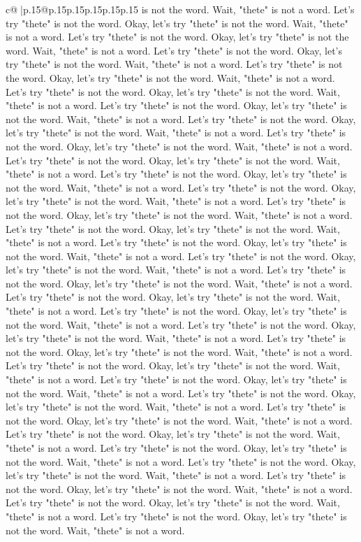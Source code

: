 \documentclass{article}
\begin{document}
{\begin{supertabular}{c@{$\;$}|p{.15\linewidth}@{}p{.15\linewidth}p{.15\linewidth}p{.15\linewidth}p{.15\linewidth}p{.15\linewidth}}
{{{is not the word. Wait, "thete" is not a word. Let's try "thete" is not the word. Okay, let's try "thete" is not the word. Wait, "thete" is not a word. Let's try "thete" is not the word. Okay, let's try "thete" is not the word. Wait, "thete" is not a word. Let's try "thete" is not the word. Okay, let's try "thete" is not the word. Wait, "thete" is not a word. Let's try "thete" is not the word. Okay, let's try "thete" is not the word. Wait, "thete" is not a word. Let's try "thete" is not the word. Okay, let's try "thete" is not the word. Wait, "thete" is not a word. Let's try "thete" is not the word. Okay, let's try "thete" is not the word. Wait, "thete" is not a word. Let's try "thete" is not the word. Okay, let's try "thete" is not the word. Wait, "thete" is not a word. Let's try "thete" is not the word. Okay, let's try "thete" is not the word. Wait, "thete" is not a word. Let's try "thete" is not the word. Okay, let's try "thete" is not the word. Wait, "thete" is not a word. Let's try "thete" is not the word. Okay, let's try "thete" is not the word. Wait, "thete" is not a word. Let's try "thete" is not the word. Okay, let's try "thete" is not the word. Wait, "thete" is not a word. Let's try "thete" is not the word. Okay, let's try "thete" is not the word. Wait, "thete" is not a word. Let's try "thete" is not the word. Okay, let's try "thete" is not the word. Wait, "thete" is not a word. Let's try "thete" is not the word. Okay, let's try "thete" is not the word. Wait, "thete" is not a word. Let's try "thete" is not the word. Okay, let's try "thete" is not the word. Wait, "thete" is not a word. Let's try "thete" is not the word. Okay, let's try "thete" is not the word. Wait, "thete" is not a word. Let's try "thete" is not the word. Okay, let's try "thete" is not the word. Wait, "thete" is not a word. Let's try "thete" is not the word. Okay, let's try "thete" is not the word. Wait, "thete" is not a word. Let's try "thete" is not the word. Okay, let's try "thete" is not the word. Wait, "thete" is not a word. Let's try "thete" is not the word. Okay, let's try "thete" is not the word. Wait, "thete" is not a word. Let's try "thete" is not the word. Okay, let's try "thete" is not the word. Wait, "thete" is not a word. Let's try "thete" is not the word. Okay, let's try "thete" is not the word. Wait, "thete" is not a word. Let's try "thete" is not the word. Okay, let's try "thete" is not the word. Wait, "thete" is not a word. Let's try "thete" is not the word. Okay, let's try "thete" is not the word. Wait, "thete" is not a word. Let's try "thete" is not the word. Okay, let's try "thete" is not the word. Wait, "thete" is not a word. Let's try "thete" is not the word. Okay, let's try "thete" is not the word. Wait, "thete" is not a word. Let's try "thete" is not the word. Okay, let's try "thete" is not the word. Wait, "thete" is not a word. Let's try "thete" is not the word. Okay, let's try "thete" is not the word. Wait, "thete" is not a word. Let's try "thete" is not the word. Okay, let's try "thete" is not the word. Wait, "thete" is not a word. Let's try "thete" is not the word. Okay, let's try "thete" is not the word. Wait, "thete" is not a word. }}}
\end{supertabular}}
\end{document}
